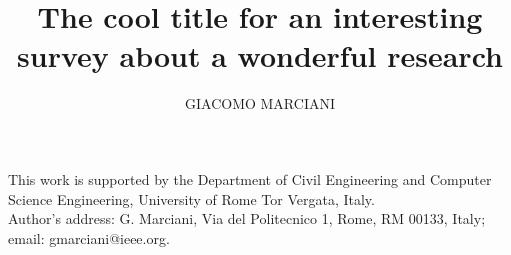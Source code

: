\documentclass[prodmode,gmlecture]{acmlarge}
\title{The cool title for an interesting survey about a wonderful research}
\author{GIACOMO MARCIANI \affil{University of Rome Tor Vergata}
}
\numberwithin{equation}{section}
\begin{document}
\begin{bottomstuff}
	This work is supported by the Department of Civil Engineering
	and Computer Science Engineering, University of Rome Tor Vergata, Italy.\\
	Author's address: G. Marciani, Via del Politecnico 1, Rome, RM 00133, Italy;
	email: gmarciani@ieee.org.
\end{bottomstuff}

\maketitle








\elecappendix

\end{document}
